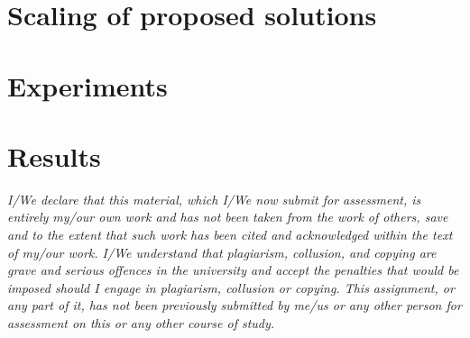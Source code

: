 \documentclass[14pt]{extarticle}
\begin{document}
\section{Scaling of proposed solutions}
\section{Experiments}
\section{Results}
{\it I/We declare that this material, which I/We now submit for assessment, is entirely my/our own work and has not been taken from the work of others, save and to the extent that such work has been cited and acknowledged within the text of my/our work. I/We understand that plagiarism, collusion, and copying are grave and serious offences in the university and accept the penalties that would be imposed should I engage in plagiarism, collusion or copying. This assignment, or any part of it, has not been previously submitted by me/us or any other person for assessment on this or any other course of study.}
\begin{comment}
The report should contain the following information:

-the chosen dataset, and the parts of the latter which have been considered,
-how data have been organized,
-the applied pre-processing techniques,
-the considered algorithms and their implementations,
-how the proposed solution scales up with data size,
-a description of the experiments,
-comments and discussion on the experimental results.

\end{comment}
\end{document}
